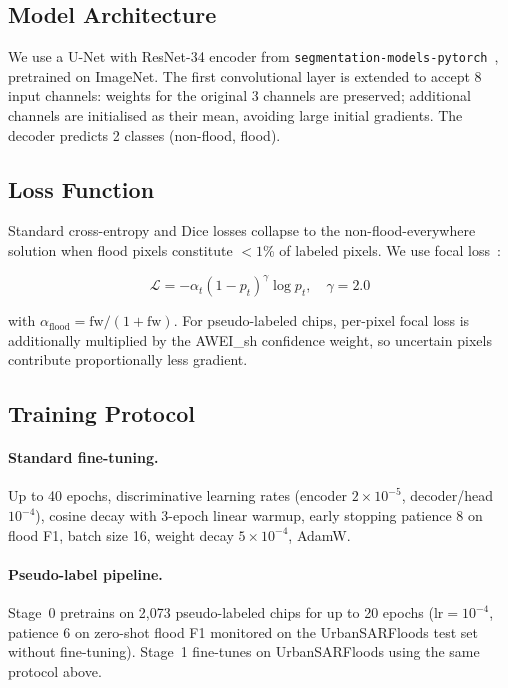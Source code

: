\documentclass[10pt,twocolumn]{article}
\begin{document}
\subsection{Model Architecture}

We use a U-Net with ResNet-34 encoder from
\texttt{segmentation-models-pytorch}~\cite{iakubovskii2019},
pretrained on ImageNet.  The first convolutional layer is extended to
accept 8 input channels: weights for the original 3 channels are
preserved; additional channels are initialised as their mean, avoiding
large initial gradients.  The decoder predicts 2 classes (non-flood,
flood).

\subsection{Loss Function}

Standard cross-entropy and Dice losses collapse to the
non-flood-everywhere solution when flood pixels constitute $<1$\% of
labeled pixels.  We use focal loss~\cite{lin2017focal}:

\[
  \mathcal{L} = -\alpha_t (1 - p_t)^\gamma \log p_t, \quad \gamma = 2.0
\]

with $\alpha_{\text{flood}} = \text{fw}/(1+\text{fw})$.
For pseudo-labeled chips, per-pixel focal loss is additionally
multiplied by the AWEI\_sh confidence weight, so uncertain pixels
contribute proportionally less gradient.

\subsection{Training Protocol}

\paragraph{Standard fine-tuning.}
Up to 40 epochs, discriminative learning rates (encoder
$2{\times}10^{-5}$, decoder/head $10^{-4}$), cosine decay with 3-epoch
linear warmup, early stopping patience 8 on flood F1, batch size 16,
weight decay $5{\times}10^{-4}$, AdamW.

\paragraph{Pseudo-label pipeline.}
Stage~0 pretrains on 2,073 pseudo-labeled chips for up to 20 epochs
($\text{lr} = 10^{-4}$, patience 6 on zero-shot flood F1 monitored
on the UrbanSARFloods test set without fine-tuning).
Stage~1 fine-tunes on UrbanSARFloods using the same protocol above.
\end{document}
